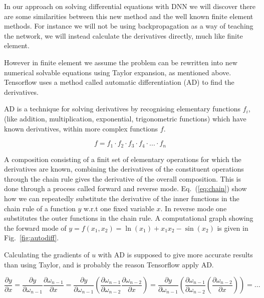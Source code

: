 \documentclass[a4paper, twocolumn]{article}
\newcommand{\fig}[1]{Fig.\ \ref{fig:#1}}
\newcommand{\eq} [1]{Eq.\ (\ref{eq:#1})}
\begin{document}
In our approach on solving differential equations with DNN we will discover there are some similarities between this new method and the well known finite element methods. For instance we will not be using backpropagation as a way of teaching the network, we will instead calculate the derivatives directly, much like finite element.

However in finite element we assume the problem can be rewritten into new numerical solvable equations using Taylor expansion, as mentioned above. Tensorflow uses a method called automatic differentiation (AD) to find the derivatives. 

AD is a technique for solving derivatives by recognising elementary functions $f_i$, (like addition, multiplication, exponential, trigonometric functions) which have known derivatives, within more complex functions $f$.  

\begin{equation}
f = f_1 \cdot f_2 \cdot f_3 \cdot f_4 \cdot ... \cdot f_n
\end{equation}

A composition consisting of a finit set of elementary operations for which the derivatives are known, combining the derivatives of the constituent operations through the chain rule gives the derivative of the overall composition. This is done through a process called forward and reverse mode. \eq{chain} show how we can repeatedly substitute the derivative of the inner functions in the chain rule of a function $y$ w.r.t one fixed variable $x$. In reverse mode one substitutes the outer functions in the chain rule. A computational graph showing the forward mode of $y = f(x_1, x_2) = \ln (x_1) + x_1 x_2 - \sin (x_2)$ is given in \fig{autodiff}.

Calculating the gradients of $u$ with AD is supposed to give more accurate results than using Taylor, and is probably the reason Tensorflow apply AD.

\begin{strip}
\begin{equation} \label{eq:chain}
\frac{\partial y}{\partial x} = \frac{\partial y}{\partial \omega_{n-1}} \frac{\partial \omega_{n-1}}{\partial x} = \frac{\partial y}{\partial \omega_{n-1}} \left( \frac{\partial \omega_{n-1}}{\partial \omega_{n-2}} \frac{\partial \omega_{n-2}}{\partial x} \right) = \frac{\partial y}{\partial \omega_{n-1}} \left( \frac{\partial \omega_{n-1}}{\partial \omega_{n-2}} \left( \frac{\partial \omega_{n-2}}{\partial x} \right) \right) = ...
\end{equation}
\end{strip}
\end{document}
